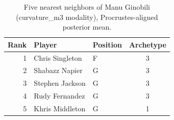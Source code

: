 \begin{table}[htbp]
  \centering\small
  \begin{tabular}{rllc}
    \toprule
    Rank & Player & Position & Archetype \\
    \midrule
    1 & Chris Singleton & F & 3 \\
    2 & Shabazz Napier & G & 3 \\
    3 & Stephen Jackson & G & 3 \\
    4 & Rudy Fernandez & G & 3 \\
    5 & Khris Middleton & G & 1 \\
    \bottomrule
  \end{tabular}
  \caption{Five nearest neighbors of Manu Ginobili (curvature_m3 modality), Procrustes-aligned posterior mean.}
  \label{tab:Manu_Ginobili_neighbors_curvature_m3}
\end{table}

